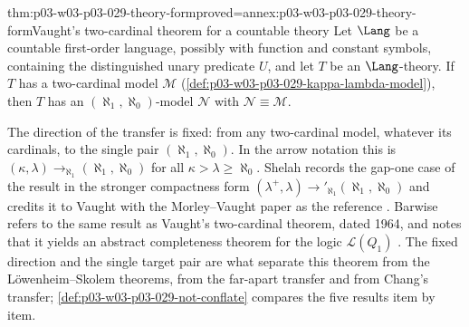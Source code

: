 \begin{hbcorollary}{thm:p03-w03-p03-029-theory-form}{proved=annex:p03-w03-p03-029-theory-form}{Vaught's two-cardinal theorem for a countable theory}
Let \(\Lang\) be a countable first-order language, possibly with function and
constant symbols, containing the distinguished unary predicate \(U\), and let
\(T\) be an \(\Lang\)-theory. If \(T\) has a two-cardinal model
\(\mathcal M\) (\cref{def:p03-w03-p03-029-kappa-lambda-model}), then \(T\)
has an \((\aleph_1,\aleph_0)\)-model \(\mathcal N\) with
\(\mathcal N\equiv\mathcal M\).
\end{hbcorollary}

The direction of the transfer is fixed: from any two-cardinal model, whatever
its cardinals, to the single pair \((\aleph_1,\aleph_0)\). In the arrow
notation this is \((\kappa,\lambda)\to_{\aleph_1}(\aleph_1,\aleph_0)\) for
all \(\kappa>\lambda\geq\aleph_0\). Shelah records the gap-one case of the
result in the stronger compactness form
\((\lambda^+,\lambda)\to'_{\aleph_1}(\aleph_1,\aleph_0)\) and credits it to
Vaught with the Morley--Vaught paper as the reference
\cite[p.~4, item~(F)]{Shelah2004PairAlephN}. Barwise refers to the same result
as Vaught's two-cardinal theorem, dated 1964, and notes that it yields an
abstract completeness theorem for the logic \(\mathcal L(Q_1)\)
\cite[Chapter~I, \S1.5, pp.~8--9]{BarwiseFeferman1985}. The fixed direction
and the single target pair are what separate this theorem from the
L\"owenheim--Skolem theorems, from the far-apart transfer and from Chang's
transfer; \cref{def:p03-w03-p03-029-not-conflate} compares the five results
item by item.

